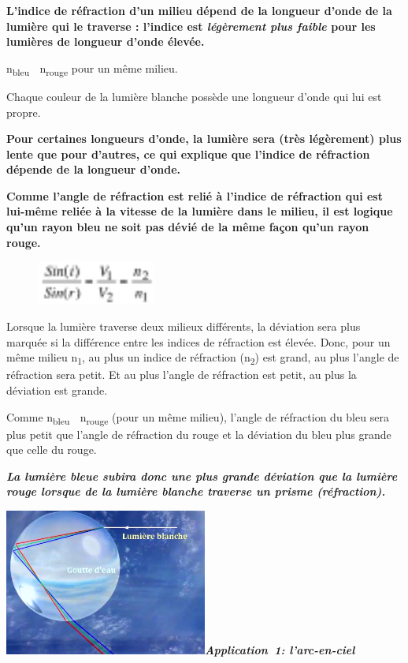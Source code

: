 \textbf{\textbf{L'indice de réfraction d'un milieu dépend de la longueur
d'onde de la lumière qui le traverse : l'indice est
}\emph{\textbf{légèrement plus faible}}\textbf{ pour les lumières de
longueur d'onde élevée.}}

n\textsubscript{bleu}  n\textsubscript{rouge }pour un même milieu.

Chaque couleur de la lumière blanche possède une longueur d'onde qui lui
est propre.

\textbf{\textbf{Pour certaines longueurs d'onde, la lumière sera (très
légèrement) plus lente que pour d'autres, ce qui explique que l'indice
de réfraction dépende de la longueur d'onde. }}

\textbf{}

\textbf{\textbf{Comme l'angle de réfraction est relié à l'indice de
réfraction qui est lui-même reliée à la vitesse de la lumière dans le
milieu, il est logique qu'un rayon bleu ne soit pas dévié de la même
façon qu'un rayon rouge.}}

\begin{figure}
\centering
\includegraphics[width=3.903cm,height=1.434cm]{Pictures/100000010000003E0000001763CB6753C8718293.png}
\caption{}
\end{figure}

Lorsque la lumière traverse deux milieux différents, la déviation sera
plus marquée si la différence entre les indices de réfraction est
élevée. Donc, pour un même milieu n\textsubscript{1}, au plus un indice
de réfraction (n\textsubscript{2}) est grand, au plus l'angle de
réfraction sera petit. Et au plus l'angle de réfraction est petit, au
plus la déviation est grande.

Comme n\textsubscript{bleu}  n\textsubscript{rouge }(pour un même
milieu), l'angle de réfraction du bleu sera plus petit que l'angle de
réfraction du rouge et la déviation du bleu plus grande que celle du
rouge.

\emph{\textbf{La lumière bleue subira donc une plus grande déviation que
la lumière rouge lorsque de la lumière blanche traverse un prisme
(réfraction). }}

\includegraphics[width=6.669cm,height=4.81cm]{Pictures/10000001000001D700000154DEDF53D3BC2FC9C3.png}\emph{\textbf{Application~1:
l'arc-en-ciel}}

